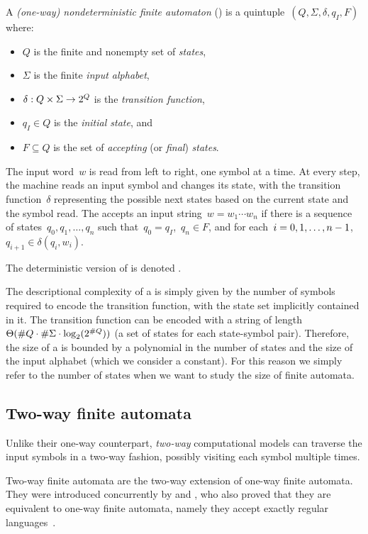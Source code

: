 \begin{defn}
	A \emph{(one-way) nondeterministic finite automaton} (\ONFA) is a quintuple~$(Q,\Sigma,\delta,q_I,F)$ where:
	\begin{itemize}
		\item $Q$ is the finite and nonempty set of \emph{states},
		\item $\Sigma$ is the finite \emph{input alphabet},
		\item $\delta:Q\times\Sigma\to2^{Q}$ is the \emph{transition function},
		\item $q_I\in Q$ is the \emph{initial state}, and
		\item $F\subseteq Q$ is the set of \emph{accepting} (or \emph{final}) \emph{states}.
	\end{itemize}
	The input word~$w$ is read from left to right, one symbol at a time.
	At every step, the machine reads an input symbol and changes its state, with the transition function~$\delta$ representing the possible next states based on the current state and the symbol read.
	The \ONFA accepts an input string~$w=w_1\cdots w_n$ if there is a sequence of states~$q_0,q_1,\dots,q_n$ such that~$q_0=q_I$,~$q_n\in F$, and for each~$i=0,1,\dots,n-1$,~$q_{i+1}\in\delta(q_i,w_i)$.

	\noindent The deterministic version of \ONFAs is denoted \ODFAs.
\end{defn}

The descriptional complexity of a \ONFA is simply given by the number of symbols required to encode the transition function, with the state set implicitly contained in it.
The transition function can be encoded with a string of length~$\Theta(\# Q\cdot\# \Sigma\cdot\log_2(2^{\# Q}))$ (a set of states for each state-symbol pair).
Therefore, the size of a \ONFA is bounded by a polynomial in the number of states and the size of the input alphabet (which we consider a constant).
For this reason we simply refer to the number of states when we want to study the size of finite automata.


\subsection{Two-way finite automata}
Unlike their one-way counterpart, \emph{two-way} computational models can traverse the input symbols in a two-way fashion, possibly visiting each symbol multiple times.

Two-way finite automata are the two-way extension of one-way finite automata.
They were introduced concurrently by \citeauthor{RabSco59} and \citeauthor{She59}, who also proved that they are equivalent to one-way finite automata, namely they accept exactly regular languages~\cite{RabSco59,She59}.

